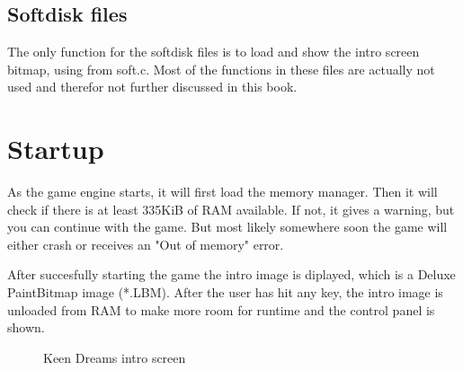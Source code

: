 \documentclass[book.tex]{subfiles}
\begin{document}
\subsection{Softdisk files}
The only function for the softdisk files is to load and show the intro screen bitmap, using  from soft.c. Most of the functions in these files are actually not used and therefor not further discussed in this book.
\pagebreak



\section{Startup}
As the game engine starts, it will first load the memory manager. Then it will check if there is at least 335KiB of RAM available. If not, it gives  a warning, but you can continue with the game. But most likely somewhere soon the game will either crash or receives an "Out of memory" error.\\
\par
After succesfully starting the game the intro image is diplayed, which is a Deluxe PaintBitmap image (*.LBM). After the user has hit any key, the intro image is unloaded from RAM to make more room for runtime and the control panel is shown.\\
\begin{figure}[H]
\centering
{}
\caption{Keen Dreams intro screen}
\end{figure}
\pagebreak
\end{document}
